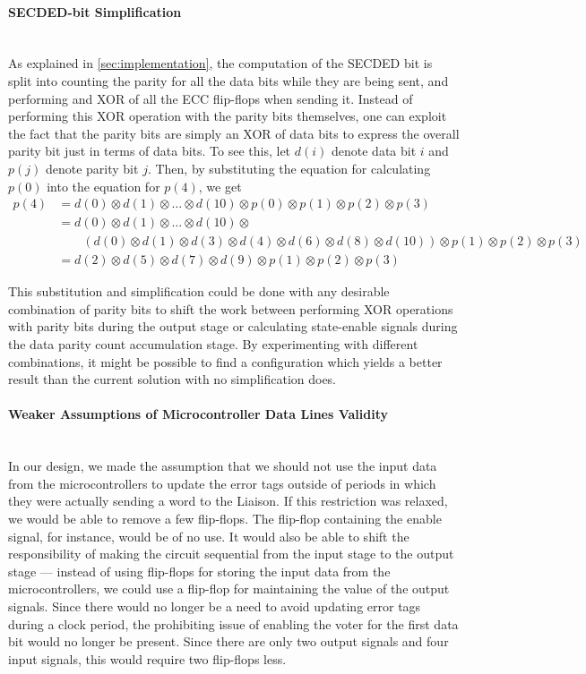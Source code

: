 \paragraph{SECDED-bit Simplification} \hfill \\
As explained in \autoref{sec:implementation}, the computation of the
SECDED bit is split into counting the parity for all the data bits
while they are being sent, and performing and XOR of all the ECC
flip-flops when sending it. Instead of performing this XOR operation
with the parity bits themselves, one can exploit the fact that the
parity bits are simply an XOR of data bits to express the overall
parity bit just in terms of data bits. To see this, let $d(i)$ denote
data bit $i$ and $p(j)$ denote parity bit $j$.  Then, by substituting
the equation for calculating $p(0)$ into the equation for $p(4)$, we
get
\begin{align*}
  p(4) &= d(0) \otimes d(1) \otimes \ldots \otimes d(10) \otimes p(0) \otimes p(1) \otimes p(2) \otimes p(3) \\
  &= d(0) \otimes d(1) \otimes \ldots \otimes d(10) \otimes \\
  & \qquad (d(0) \otimes d(1) \otimes d(3) \otimes d(4) \otimes d(6)
  \otimes d(8) \otimes d(10)) \otimes p(1) \otimes p(2) \otimes p(3) \\
  &= d(2) \otimes d(5) \otimes d(7) \otimes d(9) \otimes p(1) \otimes p(2) \otimes p(3)
\end{align*}

This substitution and simplification could be done with any desirable
combination of parity bits to shift the work between performing XOR
operations with parity bits during the output stage or calculating
state-enable signals during the data parity count accumulation
stage. By experimenting with different combinations, it might be
possible to find a configuration which yields a better
result than the current solution with no simplification does. 

\paragraph{Weaker Assumptions of Microcontroller Data Lines Validity} \hfill \\
In our design, we made the assumption that we should not use the input
data from the microcontrollers to update the error tags outside of
periods in which they were actually sending a word to the Liaison. If
this restriction was relaxed, we would be able to remove a few
flip-flops. The flip-flop containing the enable signal, for instance,
would be of no use. It would also be able to shift the responsibility
of making the circuit sequential from the input stage to the output
stage --- instead of using flip-flops for storing the input data from
the microcontrollers, we could use a flip-flop for maintaining the
value of the output signals. Since there would no longer be a need to
avoid updating error tags during a clock period, the prohibiting issue
of enabling the voter for the first data bit would no longer be
present. Since there are only two output signals and four input
signals, this would require two flip-flops less.


